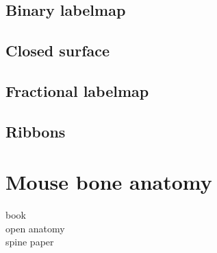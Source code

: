 \subsection{Binary labelmap}
\label{s:b-binary-labelmap}

\subsection{Closed surface}
\label{s:b-closed-surface}

\subsection{Fractional labelmap}
\label{s:b-fractional-labelmap}

\subsection{Ribbons}
\label{s:b-ribbons}


\section{Mouse bone anatomy}
\label{s:b-mouse-anatomy}
book \cite{ruberteMorphologicalMousePhenotyping2017}\\
open anatomy \cite{halleOpenAnatomyBrowser2017}\\
spine paper \cite{harrisonVertebralLandmarksIdentification2013a}